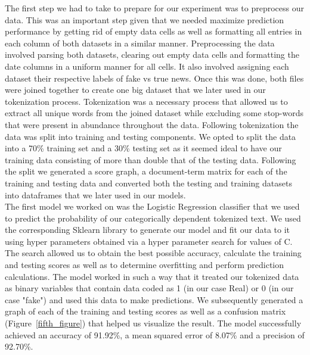 \documentclass[10pt,twocolumn,letterpaper]{article}
\begin{document}
The first step we had to take to prepare for our experiment was to preprocess our data. This was an important step given that we needed maximize prediction performance by getting rid of empty data cells as well as formatting all entries in each column of both datasets in a similar manner. Preprocessing the data involved parsing both datasets, clearing out empty data cells and formatting the date columns in a uniform manner for all cells. It also involved assigning each dataset their respective labels of fake vs true news. Once this was done, both files were joined together to create one big dataset that we later used in our tokenization process. Tokenization was a necessary process that allowed us to extract all unique words from the joined dataset while excluding some stop-words that were present in abundance throughout the data. Following tokenization the data was split into training and testing components. We opted to split the data into a 70\% training set and a 30\% testing set as it seemed ideal to have our training data consisting of more than double that of the testing data. Following the split we generated a score graph, a document-term matrix for each of the training and testing data and converted both the testing and training datasets into dataframes that we later used in our models. \\

The first model we worked on was the Logistic Regression classifier that we used to predict the probability of our categorically dependent tokenized text. We used the corresponding Sklearn library to generate our model and fit our data to it using hyper parameters obtained via a hyper parameter search for values of C. The search allowed us to obtain the best possible accuracy, calculate the training and testing scores as well as to determine overfitting and perform prediction calculations. The model worked in such a way that it treated our tokenized data as binary variables that contain data coded as 1 (in our case Real) or 0 (in our case "fake") and used this data to make predictions. We subsequently generated a graph of each of the training and testing scores as well as a confusion matrix (Figure~\ref{fifth_figure}) that helped us visualize the result. The model successfully achieved an accuracy of 91.92\%, a mean squared error of 8.07\% and a precision of 92.70\%. \\
\end{document}

